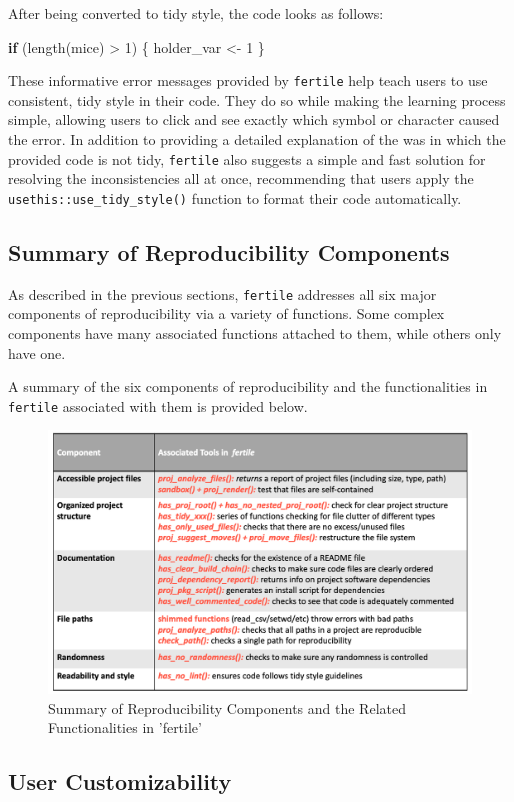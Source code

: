 \documentclass[12pt,twoside]{reedthesis}
\newenvironment{Shaded}{\begin{snugshade}}{\end{snugshade}}
\newcommand{\ControlFlowTok}[1]{\textcolor[rgb]{0.13,0.29,0.53}{\textbf{#1}}}
\newcommand{\DecValTok}[1]{\textcolor[rgb]{0.00,0.00,0.81}{#1}}
\newcommand{\FunctionTok}[1]{\textcolor[rgb]{0.00,0.00,0.00}{#1}}
\newcommand{\NormalTok}[1]{#1}
\newcommand{\OtherTok}[1]{\textcolor[rgb]{0.56,0.35,0.01}{#1}}
\newcommand{\SpecialCharTok}[1]{\textcolor[rgb]{0.00,0.00,0.00}{#1}}
\begin{document}
After being converted to tidy style, the code looks as follows:
\begin{Shaded}
\begin{Highlighting}[]
\ControlFlowTok{if}\NormalTok{ (}\FunctionTok{length}\NormalTok{(mice) }\SpecialCharTok{\textgreater{}} \DecValTok{1}\NormalTok{) \{}
\NormalTok{  holder\_var }\OtherTok{\textless{}{-}} \DecValTok{1}
\NormalTok{\}}
\end{Highlighting}
\end{Shaded}
These informative error messages provided by \texttt{fertile} help teach users to use consistent, tidy style in their code. They do so while making the learning process simple, allowing users to click and see exactly which symbol or character caused the error. In addition to providing a detailed explanation of the was in which the provided code is not tidy, \texttt{fertile} also suggests a simple and fast solution for resolving the inconsistencies all at once, recommending that users apply the \texttt{usethis::use\_tidy\_style()} function to format their code automatically.

\hypertarget{summary-of-reproducibility-components}{%
\subsection{Summary of Reproducibility Components}\label{summary-of-reproducibility-components}}

As described in the previous sections, \texttt{fertile} addresses all six major components of reproducibility via a variety of functions. Some complex components have many associated functions attached to them, while others only have one.

A summary of the six components of reproducibility and the functionalities in \texttt{fertile} associated with them is provided below.
\begin{figure}
\includegraphics[width=1\linewidth]{figure/components-summary} \caption{Summary of Reproducibility Components and the Related Functionalities in 'fertile'}\label{fig:unnamed-chunk-48}
\end{figure}
\hypertarget{user-customizability}{%
\subsection{User Customizability}\label{user-customizability}}
\end{document}

